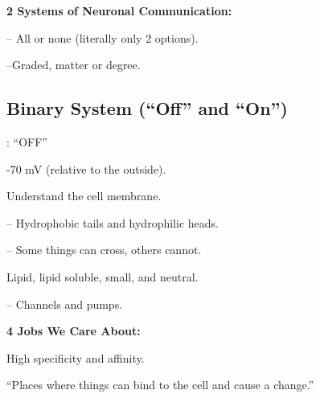 \begin{coloredlist}
    \item \textbf{2 Systems of Neuronal Communication:}
    \begin{coloredlist}
        \item {} -- All or none (literally only 2 options).
        \item {} --Graded, matter or degree.
    \end{coloredlist}
\end{coloredlist}

\subsection{Binary System (``Off'' and ``On'')}

\begin{coloredlist}
    \item {}: ``OFF'' 
    \begin{coloredlist}
        \item -70 mV (relative to the outside).
        \item Understand the cell membrane.
        \begin{coloredlist}
            \item {} -- Hydrophobic tails and hydrophilic heads.
            \item {} -- Some things can cross, others cannot.
            \begin{coloredlist}
                \item Lipid, lipid soluble, small, and neutral.
            \end{coloredlist}
            \item {} -- Channels and pumps. 
            \begin{coloredlist}
                \item \textbf{4 Jobs We Care About:}
                \begin{coloredlist}
                    \item {}
                    \begin{coloredlist}
                        \item High specificity and affinity.
                        \item ``Places where things can bind to the cell and cause a change.''
                    \end{coloredlist}

\end{coloredlist}
\end{coloredlist}
\end{coloredlist}
\end{coloredlist}
\end{coloredlist}
